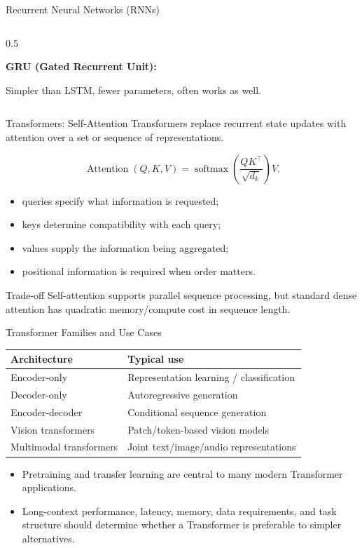 \begin{frame}{Recurrent Neural Networks (RNNs)}
\begin{columns}
\begin{column}{0.5\textwidth}
\vspace{0.2cm}

\textbf{GRU (Gated Recurrent Unit):}

Simpler than LSTM, fewer parameters, often works as well.
\end{column}
\end{columns}
\end{frame}

\begin{frame}{Transformers: Self-Attention}
Transformers replace recurrent state updates with attention over a set or sequence of representations.

\[
  \operatorname{Attention}(Q,K,V)
  = \operatorname{softmax}\!\left(
      \frac{QK^\top}{\sqrt{d_k}}
    \right)V.
\]

\begin{itemize}
  \item queries specify what information is requested;
  \item keys determine compatibility with each query;
  \item values supply the information being aggregated;
  \item positional information is required when order matters.
\end{itemize}

\begin{block}{Trade-off}
Self-attention supports parallel sequence processing, but standard dense attention has quadratic memory/compute cost in sequence length.
\end{block}
\end{frame}

\begin{frame}{Transformer Families and Use Cases}
\begin{table}
\small
\begin{tabular}{ll}
\toprule
\textbf{Architecture} & \textbf{Typical use} \\
\midrule
Encoder-only & Representation learning / classification \\
Decoder-only & Autoregressive generation \\
Encoder-decoder & Conditional sequence generation \\
Vision transformers & Patch/token-based vision models \\
Multimodal transformers & Joint text/image/audio representations \\
\bottomrule
\end{tabular}
\end{table}

\begin{itemize}
  \item Pretraining and transfer learning are central to many modern Transformer applications.
  \item Long-context performance, latency, memory, data requirements, and task structure should determine whether a Transformer is preferable to simpler alternatives.
\end{itemize}
\end{frame}

